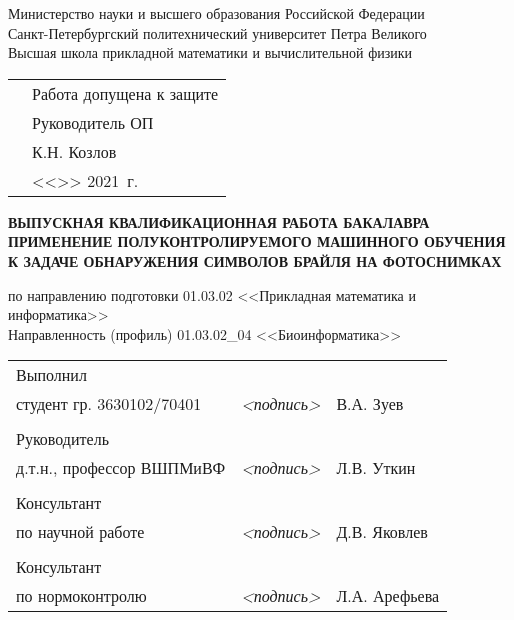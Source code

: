 \documentclass{main.tex}[subfiles]
\begin{document}
\begin{titlepage}
\begin{center}
    Министерство науки и высшего образования Российской Федерации \\
    Санкт-Петербургский политехнический университет Петра Великого \\
    Высшая школа прикладной математики и вычислительной физики
    \vfill
    \noindent
    \begin{minipage}{\linewidth} %
        \begin{tabularx}{\linewidth}{Xl}
            &Работа допущена к защите     \\
            & Руководитель ОП \\
            &\underline{\hspace*{0.1\textheight}} К.Н. Козлов     \\
            &<<\underline{\hspace*{0.05\textheight}}>> \underline{\hspace*{0.1\textheight}} 2021~г.  \\
        \end{tabularx}
    \end{minipage}
    \vfill
    \large{\textbf{ВЫПУСКНАЯ КВАЛИФИКАЦИОННАЯ РАБОТА БАКАЛАВРА}} \\
    \vspace{.7\baselineskip}
    \large{\textbf{
            ПРИМЕНЕНИЕ ПОЛУКОНТРОЛИРУЕМОГО МАШИННОГО ОБУЧЕНИЯ
            К ЗАДАЧЕ ОБНАРУЖЕНИЯ СИМВОЛОВ БРАЙЛЯ НА ФОТОСНИМКАХ}}
\end{center}

\noindent по направлению подготовки 01.03.02 <<Прикладная математика и информатика>> \\

\noindent Направленность (профиль) 01.03.02\_04 <<Биоинформатика>>

\vfill

\noindent
\begin{tabular}{@{}lp{}l}
Выполнил & & \\
студент гр. 3630102/70401 & \textit{<подпись>} & В.А. Зуев \\
& & \\
Руководитель & & \\
д.т.н., профессор ВШПМиВФ & \textit{<подпись>} & Л.В. Уткин\\
& & \\
Консультант & & \\
по научной работе & \textit{<подпись>} & Д.В. Яковлев\\
& & \\
Консультант & & \\
по нормоконтролю & \textit{<подпись>} & Л.А. Арефьева\\
\end{tabular}

\vfill

\end{titlepage}
\end{document}
